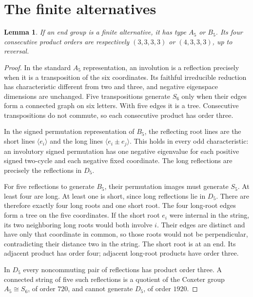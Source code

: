 \documentclass[11pt,a4paper]{article}
\newtheorem{lemma}[theorem]{Lemma}
\newcommand{\gen}[1]{\langle#1\rangle}
\begin{document}
\section{The finite alternatives}
\begin{lemma}\label{finite}
If an end group is a finite alternative, it has type $A_5$ or
$B_5$. Its four consecutive product orders are respectively
$(3,3,3,3)$ or $(4,3,3,3)$, up to reversal.
\end{lemma}
\begin{proof}
In the standard $A_5$ representation, an involution is a reflection
precisely when it is a transposition of the six coordinates. Its
faithful irreducible reduction has characteristic different from
two and three, and negative eigenspace dimensions are unchanged.
Five transpositions generate $S_6$ only when their edges form a
connected graph on six letters. With five edges it is a tree.
Consecutive transpositions do not commute, so each consecutive
product has order three.

In the signed permutation representation of $B_5$, the reflecting
root lines are the short lines $\gen{e_i}$ and the long lines
$\gen{e_i\pm e_j}$. This holds in every odd characteristic:
an involutory signed permutation has one negative eigenvalue for
each positive signed two-cycle and each negative fixed coordinate.
The long reflections are precisely the reflections in $D_5$.

For five reflections to generate $B_5$, their permutation images
must generate $S_5$. At least four are long. At least one is short,
since long reflections lie in $D_5$. There are therefore exactly
four long roots and one short root. The four long-root edges form
a tree on the five coordinates. If the short root $e_i$ were
internal in the string, its two neighboring long roots would both
involve $i$. Their edges are distinct and have only that coordinate
in common, so those roots would not be perpendicular, contradicting
their distance two in the string. The short root is at an end.
Its adjacent product has order four; adjacent long-root products
have order three.

In $D_5$ every noncommuting pair of reflections has product order
three. A connected string of five such reflections is a quotient
of the Coxeter group $A_5\cong S_6$, of order $720$, and cannot
generate $D_5$, of order $1920$.
\end{proof}
\end{document}
